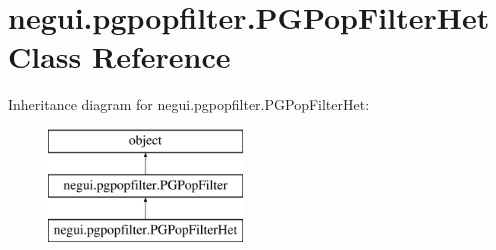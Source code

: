 \hypertarget{classnegui_1_1pgpopfilter_1_1PGPopFilterHet}{}\section{negui.\+pgpopfilter.\+P\+G\+Pop\+Filter\+Het Class Reference}
\label{classnegui_1_1pgpopfilter_1_1PGPopFilterHet}
Inheritance diagram for negui.\+pgpopfilter.\+P\+G\+Pop\+Filter\+Het\+:\begin{figure}[H]
\begin{center}
\leavevmode
\includegraphics[height=3.000000cm]{classnegui_1_1pgpopfilter_1_1PGPopFilterHet}
\end{center}
\end{figure}
